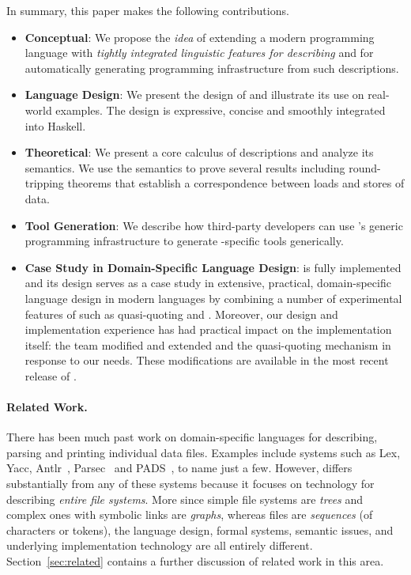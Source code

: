 In summary, this paper makes the following contributions.
\begin{itemize}
\item {\bf Conceptual}:  We propose the {\em idea} 
of extending a modern programming language with
{\em tightly integrated linguistic features for describing \filestores{}}
and for automatically generating programming infrastructure from such 
descriptions.

\item {\bf Language Design}: We present the design of \forest{}
  and illustrate its use on real-world examples.
  The design is expressive, concise and smoothly integrated into
  Haskell.  

\item {\bf Theoretical}: We present a core calculus of \forest{}
descriptions and analyze its semantics.  We use the semantics
to prove several results including round-tripping theorems that
establish a correspondence between loads and stores of \filestore{} data.

\item {\bf Tool Generation}: We describe how third-party developers
  can use \haskell{}'s generic programming infrastructure to generate
  \filestore{}-specific tools generically.

\item {\bf Case Study in Domain-Specific Language Design}: \forest{}
  is fully implemented and its design serves
  as a case study in extensive, practical, domain-specific
  language design in modern languages by combining a number of
  experimental features of \haskell{} such as quasi-quoting and \template{}.
  Moreover, our \forest{} design and implementation experience 
  has had practical impact on the \haskell{} implementation itself:  
  the \haskell{} team modified and extended \template{} and the
  quasi-quoting mechanism in response
  to our needs.  These modifications
  are available in the most recent release of \haskell{}.
\end{itemize}

\paragraph*{Related Work.}
There has been much past work on domain-specific languages for
describing, parsing and printing individual data files. 
Examples include 
systems such as Lex, Yacc,
Antlr~\cite{antlr}, Parsec~\cite{LeijenMeijer:parsec} and 
PADS~\cite{fisher+:toplas}, to name just a few.  
However, \forest{} differs
substantially from any of these systems because it focuses on technology
for describing {\em entire file systems}.  More since 
simple file systems are {\em trees} and complex ones with symbolic links are 
{\em graphs}, whereas files are {\em sequences} (of characters or tokens), 
the language design, formal systems,
semantic issues, and underlying implementation 
technology are all entirely different.  Section~\ref{sec:related}
contains a further discussion of related work in this area.

